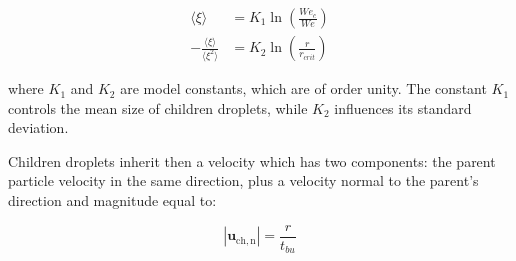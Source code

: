 \begin{subequations}
\label{eq:gorokhovski_epsilon_parameters_definition}
\begin{align}
\langle \xi \rangle &=  K_1 \ln \left(  \frac{We_c}{We}  \right) \\
- \frac{\langle \xi \rangle}{\langle \xi^2 \rangle} &=  K_2 \ln \left( \frac{r}{r_{crit}} \right)
\end{align}
\end{subequations}

where $K_1$ and $K_2$ are model constants, which are of order unity. The constant $K_1$ controls the mean size of children droplets, while $K_2$ influences its standard deviation.

Children droplets inherit then a velocity which has two components: the parent particle velocity in the same direction, plus a velocity normal to the parent's direction and magnitude equal to:

\begin{equation}
|\textbf{u}_\mathrm{ch,n} | = \frac{r}{t_{bu}}
\end{equation}




